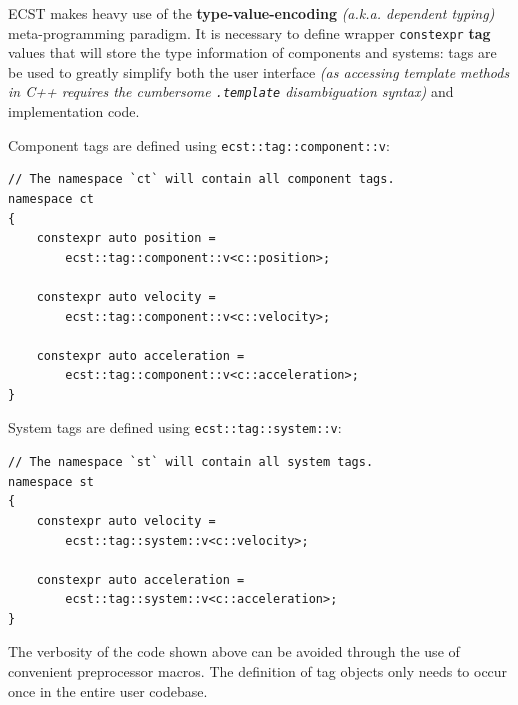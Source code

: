 \documentclass[twoside, 12pt, a4paper, openany]{book}
\begin{document}
ECST makes heavy use of the \textbf{type-value-encoding} \emph{(a.k.a.
dependent typing)} meta-programming paradigm. It is necessary to define
wrapper
\texttt{constexpr}
\textbf{tag} values that will store the type information of components
and systems: tags are be used to greatly simplify both the user
interface \emph{(as accessing template methods in C++ requires the
cumbersome
\texttt{.template}
disambiguation syntax)} and implementation code.

Component tags are defined using
\texttt{ecst::tag::component::v}:

\begin{verbatim}
// The namespace `ct` will contain all component tags.
namespace ct
{
    constexpr auto position =
        ecst::tag::component::v<c::position>;

    constexpr auto velocity =
        ecst::tag::component::v<c::velocity>;

    constexpr auto acceleration =
        ecst::tag::component::v<c::acceleration>;
}
\end{verbatim}

System tags are defined using
\texttt{ecst::tag::system::v}:

\begin{verbatim}
// The namespace `st` will contain all system tags.
namespace st
{
    constexpr auto velocity =
        ecst::tag::system::v<c::velocity>;

    constexpr auto acceleration =
        ecst::tag::system::v<c::acceleration>;
}
\end{verbatim}

The verbosity of the code shown above can be avoided through the use of
convenient preprocessor macros. The definition of tag objects only needs
to occur once in the entire user codebase.
\end{document}
